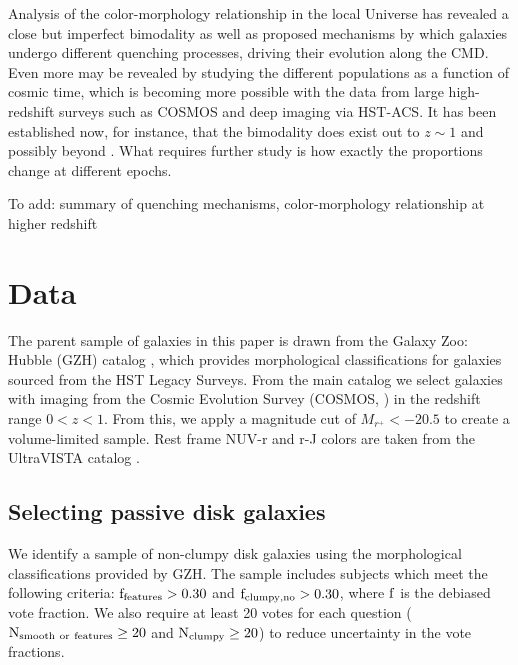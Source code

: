 \documentclass[useAMS,usenatbib]{mn2e}
\begin{document}
Analysis of the color-morphology relationship in the local Universe has revealed a close but imperfect bimodality as well as proposed mechanisms by which galaxies undergo different quenching processes, driving their evolution along the CMD. Even more may be revealed by studying the different populations as a function of cosmic time, which is becoming more possible with the data from large high-redshift surveys such as COSMOS and deep imaging via HST-ACS. It has been established now, for instance, that the bimodality does exist out to $z\sim1$ \citep{Bell2004,Cirasuolo2007,Mignoli2009} and possibly beyond \citep{Giallongo2005,VanDokkum2006,Franzetti2007,Cassata2008}. What requires further study is how exactly the proportions change at different epochs.

To add: summary of quenching mechanisms, color-morphology relationship at higher redshift

\section{Data}
\label{sec:Data}

The parent sample of galaxies in this paper is drawn from the Galaxy Zoo: Hubble (GZH) catalog \citep{Willett2016}, which provides morphological classifications for galaxies sourced from the HST Legacy Surveys. From the main catalog we select galaxies with imaging from the Cosmic Evolution Survey (COSMOS, \citet{Scoville2007}) in the redshift range $0<z<1$. From this, we apply a magnitude cut of $M_{r^{+}}<-20.5$ to create a volume-limited sample. Rest frame NUV-r and r-J colors are taken from the UltraVISTA catalog \citep{McCracken2012,Ilbert2013}.

\subsection{Selecting passive disk galaxies}
\label{sec:sampleselection}
We identify a sample of non-clumpy disk galaxies using the morphological classifications provided by GZH. The sample includes subjects which meet the following criteria: $\rm f_{features} > 0.30$ and $\rm f_{clumpy,no} > 0.30$, where $\rm f$ is the debiased vote fraction. We also require at least 20 votes for each question ($\rm N_{smooth~or~features} \ge 20$ and $\rm N_{clumpy} \ge 20$) to reduce uncertainty in the vote fractions.
 
\end{document}
